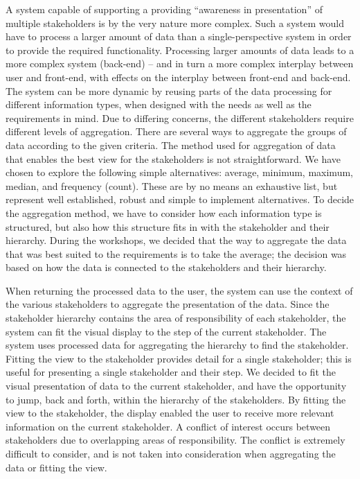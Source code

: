 A system capable of supporting a providing 
“awareness in presentation” of multiple stakeholders is by the very nature 
more complex. Such a system would have to process a larger amount of data than 
a single-perspective system in order to provide the required functionality. 
Processing larger amounts of data leads to a more complex system (back-end) – 
and in turn a more complex interplay between user and front-end, with effects 
on the interplay between front-end and back-end. The system can be more 
dynamic by reusing parts of the data processing for 
different information types, when designed with the needs as well as the 
requirements in mind. Due to differing concerns, the different stakeholders 
require different levels of aggregation. There are several ways to 
aggregate the groups of data according to the given criteria. The method used 
for aggregation of data that enables the best view for the stakeholders is not 
straightforward. We have chosen to explore the following simple alternatives: 
average, minimum, maximum, median, and frequency (count). These are by no 
means an exhaustive list, but represent well established, robust and simple to 
implement alternatives. To decide the aggregation method, we have to consider 
how each information type is structured, but also how this structure fits in 
with the stakeholder and their hierarchy. During the workshops, we decided 
that the way to aggregate the data that was best suited to the requirements is 
to take the average; the decision was based on how the data is connected to the stakeholders and their hierarchy.

When returning the processed data to the user, the system can use the 
context of the various stakeholders to aggregate the presentation of the data. Since the stakeholder hierarchy contains the area of responsibility of each stakeholder, the system can fit the visual display to the step of the current stakeholder. The system uses processed data for aggregating the hierarchy to find the stakeholder. Fitting the view to the stakeholder provides detail for a single stakeholder; this is useful for presenting a single stakeholder and their step.
We decided to fit the visual presentation of data 
to the current stakeholder, and have the opportunity to jump, back and forth, 
within the hierarchy of the stakeholders. By fitting the view to the 
stakeholder, the display enabled the user to receive more relevant information 
on the current stakeholder. A conflict of interest occurs between stakeholders 
due to overlapping areas of responsibility. The conflict is extremely difficult 
to consider, and is not taken into consideration when aggregating the data or 
fitting the view.

